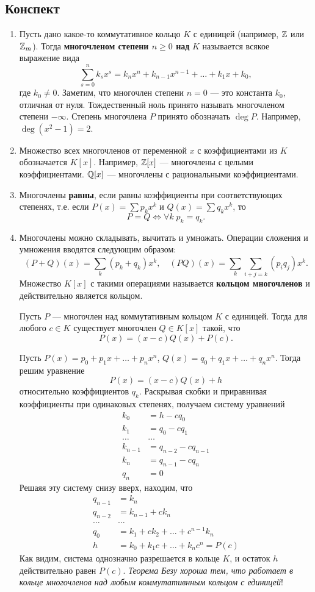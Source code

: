 \subsection*{Конспект}

\begin{enumerate}
\item Пусть дано какое-то коммутативное кольцо $K$ с единицей (например, $\mathbb Z$ или $\mathbb Z_m$). Тогда \textbf{многочленом степени $n\ge 0$ над} $K$ называется всякое выражение вида
$$
\sum_{s=0}^n k_sx^s = k_nx^n+k_{n-1}x^{n-1}+\dots+k_1x+k_0,
$$
где $k_0\ne 0$. Заметим, что многочлен степени $n=0$ --- это константа $k_0$, отличная от нуля. Тождественный ноль принято называть многочленом степени $-\infty$. Степень многочлена $P$ принято обозначать $\deg P$. Например, $\deg(x^2-1)=2$.
\item Множество всех многочленов от переменной $x$ с коэффициентами из $K$ обозначается $K[x]$.
Например, $\mathbb Z[x]$ --- многочлены с целыми коэффициентами. $\mathbb Q[x]$ --- многочлены с рациональными коэффициентами.
\item Многочлены \textbf{равны}, если равны коэффициенты при соответствующих степенях, т.е. если $P(x)=\sum p_kx^k$ и $Q(x)=\sum q_kx^k$,
то
$$
P=Q\Leftrightarrow \forall k \; p_k=q_k.
$$
\item Многочлены можно складывать, вычитать и умножать. Операции сложения и умножения вводятся следующим образом:
$$
(P+Q)(x) = \sum_k(p_k+q_k)x^k,\quad (PQ)(x) = \sum_k\sum_{i+j=k}(p_iq_j)x^k.
$$
Множество $K[x]$ с такими операциями называется \textbf{кольцом многочленов} и действительно является кольцом.

\begin{thrm}[Без\'y]
Пусть $P$ --- многочлен над коммутативным кольцом $K$ с единицей. Тогда для любого $c\in K$ существует многочлен $Q\in K[x]$ такой, что
$$
P(x) = (x-c)Q(x) + P(c).
$$
\end{thrm}
\pf
Пусть $P(x)=p_0+p_1x+\dots+p_nx^n$, $Q(x)=q_0+q_1x+\dots+q_nx^n$. Тогда решим уравнение
$$
P(x) = (x-c)Q(x) + h
$$
относительно коэффициентов $q_k$. Раскрывая скобки и приравнивая коэффициенты при одинаковых степенях, получаем систему уравнений
\begin{align*}
k_0 & = h-cq_0 \\
k_1 & = q_0-cq_1 \\
\dots & \dots \\
k_{n-1} & = q_{n-2}-cq_{n-1} \\
k_n & = q_{n-1}-cq_n \\
q_n & =  0
\end{align*}
Решаяя эту систему снизу вверх, находим, что
\begin{align*}
q_{n-1} & = k_n \\
q_{n-2} & = k_{n-1} + c k_n \\
\dots & \dots \\
q_0 & = k_1+ck_2+\dots +c^{n-1}k_n \\
h & =  k_0 + k_1c+\dots +k_nc^n = P(c)
\end{align*}
Как видим, система однозначно разрешается в кольце $K$, и остаток $h$ действительно равен $P(c)$.
\epf
\textit{Теорема Безу хороша тем, что работает в кольце многочленов над любым коммутативнным кольцом с единицей}!


\end{enumerate}

